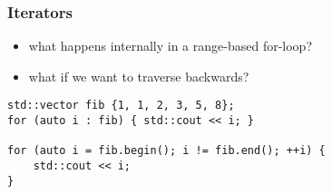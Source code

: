 \begin{frame}[fragile]
    \frametitle{Iterators}
    \begin{itemize}
        \item what happens internally in a range-based for-loop?
        \item what if we want to traverse backwards?
    \end{itemize}
    \begin{lstlisting}[numbers=none]
std::vector fib {1, 1, 2, 3, 5, 8};
for (auto i : fib) { std::cout << i; }

for (auto i = fib.begin(); i != fib.end(); ++i) {
    std::cout << i;
}
    \end{lstlisting}
\end{frame}


